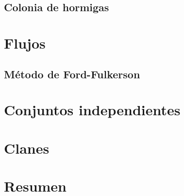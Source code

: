 \subsection{Colonia de hormigas}

\section{Flujos}

\subsection{Método de Ford-Fulkerson}

\section{Conjuntos independientes}

\section{Clanes}

\section{Resumen}
